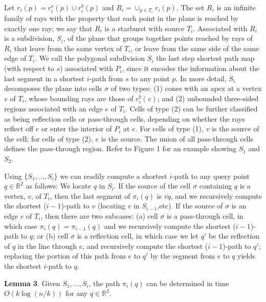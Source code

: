 \documentclass[a4paper]{article}
\begin{document}
Let \(r_i(p) = r^s_i (p) \cup r^b_i (p)\) and \(R_i = \cup_{p \in T_i} r_i(p)\). The set \(R_i\) is an infinite family of rays with the property that each point in the plane is reached by exactly one ray; we say that \(R_i\) is a starburst with source \(T_i\). Associated with \(R_i\) is a subdivision, \(S_i\), of the plane that groups together points reached by rays of \(R_i\) that leave from the same vertex of \(T_i\), or leave from the same side of the same edge of \(T_i\). We call the polygonal subdivision \(S_i\) the last step shortest path map (with respect to \(s\)) associated with \(P_i\), since it encodes the information about the last segment in a shortest \(i\)-path from \(s\) to any point \(p\). In more detail, \(S_i\) decomposes the plane into cells \(\sigma\) of two types: (1) cones with an apex at a vertex \(v\) of \(T_i\), whose bounding rays are those of \(r^b_i (v)\); and (2) unbounded three-sided regions associated with an edge \(e\) of \(T_i\). Cells of type (2) can be further classified as being reflection cells or pass-through cells, depending on whether the rays reflect off \(e\) or enter the interior of \(P_i\) at \(e\). For cells of type (1), \(v\) is the source of the cell; for cells of type (2), \(e\) is the source. The union of all pass-through cells defines the pass-through region. Refer to Figure 1 for an example showing \(S_1\) and \(S_2\).

Using \(\{S_1, \dots, S_i\}\) we can readily compute a shortest \(i\)-path to any query point \(q \in \mathbb{R} ^ 2\) as follows: We locate \(q\) in \(S_i\). If the source of the cell \(\sigma\) containing \(q\) is a vertex, \(v\), of \(T_i\), then the last segment of \(\pi_i(q)\) is \(\overline{vq}\), and we recursively compute the shortest (\(i - 1\))-path to \(v\) (locating \(v\) in \(S_{i-1}\),etc). If the source of \(\sigma\) is an edge \(e\) of \(T_i\), then there are two subcases: (a) cell \(\sigma\) is a pass-through cell, in which case \(\pi_i(q) = \pi_{i-1}(q)\) and we recursively compute the shortest (\(i - 1\))-path to \(q\); or (b) cell \(\sigma\) is a reflection cell, in which case we let \(q'\) be the reflection of \(q\) in the line through \(e\), and recursively compute the shortest (\(i - 1\))-path to \(q'\); replacing the portion of this path from \(e\) to \(q'\) by the segment from \(e\) to \(q\) yields the shortest \(i\)-path to \(q\).

\textbf{Lemma 3}. Given \(S_1, \dots, S_i\), the path \(\pi_i(q)\) can be determined in time \(O(k \log(n/k))\) for any \(q \in \mathbb{R} ^ 2\).
\end{document}
